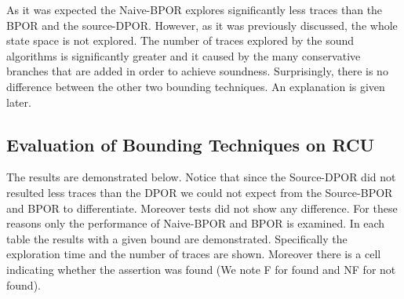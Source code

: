 

As it was expected the Naive-BPOR explores significantly less traces than the BPOR and the source-DPOR. However, as it was previously discussed, the whole
state space is not explored. The number of traces explored by the sound algorithms is significantly greater and it caused by the many conservative branches that are
added in order to achieve soundness. Surprisingly, there is no difference between the other two bounding techniques. An explanation is given later.

\subsection{Evaluation of Bounding Techniques on RCU}
The results are demonstrated below. Notice that since the Source-DPOR did not resulted less traces than the DPOR we could not expect from the Source-BPOR and BPOR
to differentiate. Moreover tests did not show any difference. For these reasons only the performance of Naive-BPOR and BPOR is examined. In each table
the results with a given bound are demonstrated. Specifically the exploration time and the number of traces are shown. 
Moreover there is a cell indicating whether the assertion was found (We note F for found and NF for not found).




